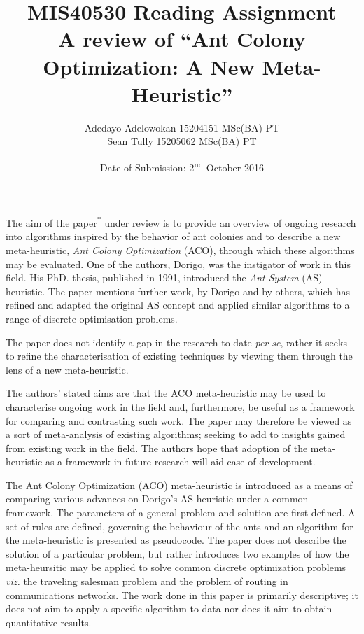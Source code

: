 \documentclass[a4paper,10pt]{report}
\begin{document}

\title{MIS40530 Reading Assignment
\\A review of ``Ant Colony Optimization: A New Meta-Heuristic''}
\author{Adedayo Adelowokan 15204151 MSc(BA) PT\\ Sean Tully 15205062 MSc(BA) PT}
\date{Date of Submission: 2\textsuperscript{nd} October 2016}
\maketitle
The aim of the paper\textsuperscript{*} under review is to provide an overview of ongoing research into algorithms inspired by the behavior of ant colonies and to describe a new meta-heuristic, \emph{Ant Colony Optimization} (ACO), through which these algorithms may be evaluated.  One of the authors, Dorigo, was the instigator of work in this field.  His PhD. thesis, published in 1991, introduced the \emph{Ant System} (AS) heuristic. The paper mentions further work, by Dorigo and by others, which has refined and adapted the original AS concept and applied similar algorithms to a range of discrete optimisation problems.  

The paper does not identify a gap in the research to date \emph{per se}, rather it seeks to refine the characterisation of existing techniques by viewing them through the lens of a new meta-heuristic.

The authors' stated aims are that the ACO meta-heuristic may be used to characterise ongoing work in the field and, furthermore, be useful as a framework for comparing and contrasting such work.  The paper may therefore be viewed as a sort of meta-analysis of existing algorithms; seeking to add to insights gained from existing work in the field.  The authors hope that adoption of the meta-heuristic as a framework in future research will aid ease of development.

The Ant Colony Optimization (ACO) meta-heuristic is introduced as a means of comparing various advances on Dorigo's AS heuristic under a common framework.  The parameters of a general problem and solution are first defined.  A set of rules are defined, governing the behaviour of the ants and an algorithm for the meta-heuristic is presented as pseudocode.  The paper does not describe the solution of a particular problem, but rather introduces two examples of how the meta-heursitic may be applied to solve common discrete optimization problems \emph{viz.} the traveling salesman problem and the problem of routing in communications networks.  The work done in this paper is primarily descriptive; it does not aim to apply a specific algorithm to data nor does it aim to obtain quantitative results.
 
\end{document}

